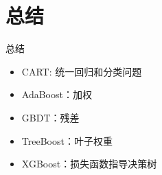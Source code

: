 
\section{总结}

\begin{frame}{总结}
\begin{itemize}
    \item CART: 统一回归和分类问题
    \item AdaBoost：加权
    \item GBDT：残差
    \item TreeBoost：叶子权重
    \item XGBoost：损失函数指导决策树
\end{itemize}
\end{frame}
